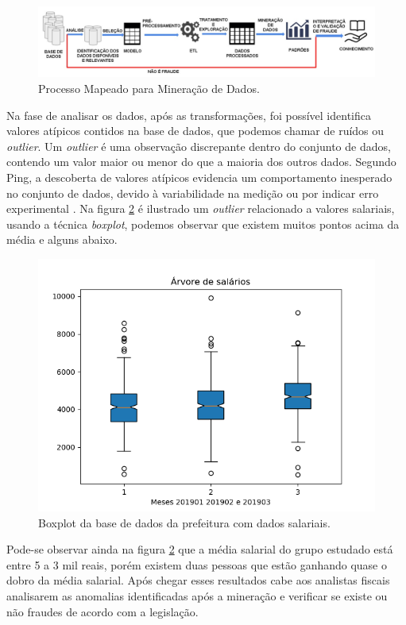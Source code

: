 \documentclass[12pt]{article}
\begin{document}
\begin{figure}[!ht]
    \centering
    \includegraphics[width=.9\textwidth]{Processo2.png}
    \caption{Processo Mapeado para Mineração de Dados.}
    \label{fig:Processo}
\end{figure}

Na fase de analisar os dados, após as transformações, foi possível identifica valores atípicos contidos na base de dados, que podemos chamar de ruídos ou \textit{outlier}. Um \textit{outlier} é uma observação discrepante dentro do conjunto de dados, contendo um valor maior ou menor do que a maioria dos outros dados. Segundo Ping, a descoberta de valores atípicos evidencia um comportamento inesperado no conjunto de dados, devido à variabilidade na medição ou por indicar erro experimental \cite{PING2010}. Na figura \ref{fig:Outlier} é ilustrado um \textit{outlier} relacionado a valores salariais, usando a técnica \textit{boxplot}, podemos observar que existem muitos pontos acima da média e alguns abaixo. 

\begin{figure}[!ht]
    \centering
    \includegraphics[width=.6\textwidth]{Outlier.png}
    \caption{Boxplot da base de dados da prefeitura com dados salariais.}
    \label{fig:Outlier}
\end{figure}

Pode-se observar ainda na figura \ref{fig:Outlier} que a média salarial do grupo estudado está entre 5 a 3 mil reais, porém existem duas pessoas que estão ganhando quase o dobro da média salarial. Após chegar esses resultados cabe aos analistas fiscais analisarem as anomalias identificadas após a mineração e verificar se existe ou não fraudes de acordo com a legislação.
\end{document}
